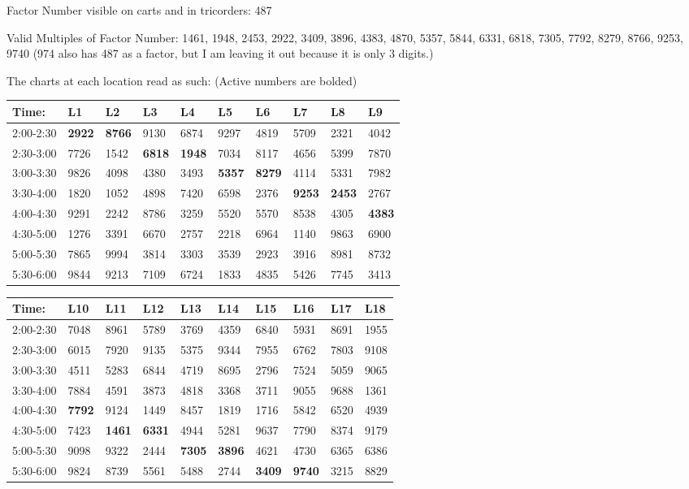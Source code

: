 \documentclass[green]{elementals}
\begin{document}
\name{\gActiveConduitLocations{}}

Factor Number visible on carts and in tricorders: 487

Valid Multiples of Factor Number: 1461, 1948, 2453, 2922, 3409, 3896, 4383, 4870, 5357, 5844, 6331, 6818, 7305, 7792, 8279, 8766, 9253, 9740 (974 also has 487 as a factor, but I am leaving it out because it is only 3 digits.)



The charts at each location read as such: (Active numbers are bolded)\\

\begin{tabular}{ l || l |  l | l | l | l | l | l | l | l |}
  Time: & L1 & L2 & L3 & L4 & L5 & L6 & L7 & L8 & L9  \\ \hline \hline
  2:00-2:30 & {\bf 2922} & {\bf 8766} & 9130 & 6874 & 9297 & 4819 & 5709 & 2321 & 4042 \\ \hline
  2:30-3:00 & 7726 & 1542 & {\bf 6818} & {\bf 1948} & 7034 & 8117 & 4656 & 5399 & 7870 \\ \hline
  3:00-3:30 & 9826 & 4098 & 4380 & 3493 & {\bf 5357} & {\bf 8279} & 4114 & 5331 & 7982 \\ \hline
  3:30-4:00 & 1820 & 1052 & 4898 & 7420 & 6598 & 2376 & {\bf 9253} & {\bf 2453} & 2767 \\ \hline
  4:00-4:30 & 9291 & 2242 & 8786 & 3259 & 5520 & 5570& 8538 & 4305 & {\bf 4383} \\ \hline
  4:30-5:00 & 1276 & 3391 & 6670 & 2757 & 2218 & 6964 & 1140 & 9863 & 6900 \\ \hline
  5:00-5:30 & 7865 & 9994 & 3814 & 3303 & 3539 & 2923 & 3916 & 8981 & 8732 \\ \hline
  5:30-6:00 & 9844 & 9213 & 7109 & 6724 & 1833 & 4835 & 5426 & 7745 & 3413 \\ \hline
\end{tabular}

\begin{tabular}{ l || l |  l | l | l | l | l | l | l | l |}
  Time: & L10 & L11 & L12 & L13 & L14 & L15 & L16 & L17 & L18  \\ \hline \hline
  2:00-2:30 & 7048 & 8961 & 5789 & 3769 & 4359 & 6840 & 5931 & 8691 & 1955  \\ \hline
  2:30-3:00 & 6015 & 7920 & 9135 & 5375 & 9344 & 7955 & 6762 & 7803 & 9108  \\ \hline
  3:00-3:30 & 4511 & 5283 & 6844 & 4719 & 8695 & 2796 & 7524 & 5059 & 9065  \\ \hline
  3:30-4:00 & 7884 & 4591 & 3873 & 4818 & 3368 & 3711 & 9055 & 9688 & 1361  \\ \hline
  4:00-4:30 & {\bf 7792} & 9124& 1449 & 8457 & 1819 & 1716 & 5842 & 6520 & 4939  \\ \hline
  4:30-5:00 & 7423 & {\bf 1461} & {\bf 6331} & 4944 & 5281 & 9637 & 7790 & 8374 & 9179  \\ \hline
  5:00-5:30 & 9098 & 9322 & 2444 & {\bf 7305} & {\bf 3896} & 4621 & 4730 & 6365 & 6386  \\ \hline
  5:30-6:00 & 9824 & 8739 & 5561 & 5488 & 2744 & {\bf 3409} & {\bf 9740} & 3215 & 8829  \\ \hline
\end{tabular}
\end{document}
